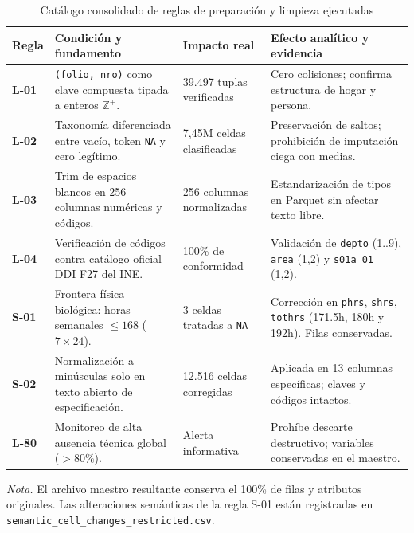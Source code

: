 \begin{table}[htbp]
\centering
\caption{Catálogo consolidado de reglas de preparación y limpieza ejecutadas}
\label{tab:reglas}
\begin{tabularx}{\textwidth}{>{\raggedright\arraybackslash\small}p{1.2cm}>{\raggedright\arraybackslash\small}p{3.8cm}>{\raggedright\arraybackslash\small}p{1.7cm}>{\raggedright\arraybackslash\small}X}
\toprule
\textbf{Regla} & \textbf{Condición y fundamento} & \textbf{Impacto real} & \textbf{Efecto analítico y evidencia} \\
\midrule
\textbf{L-01} & \texttt{(folio, nro)} como clave compuesta tipada a enteros $\mathbb{Z}^+$. & 39.497 tuplas verificadas & Cero colisiones; confirma estructura de hogar y persona. \\
\textbf{L-02} & Taxonomía diferenciada entre vacío, token \texttt{NA} y cero legítimo. & 7,45M celdas clasificadas & Preservación de saltos; prohibición de imputación ciega con medias. \\
\textbf{L-03} & Trim de espacios blancos en 256 columnas numéricas y códigos. & 256 columnas normalizadas & Estandarización de tipos en Parquet sin afectar texto libre. \\
\textbf{L-04} & Verificación de códigos contra catálogo oficial DDI F27 del INE. & 100\% de conformidad & Validación de \texttt{depto} (1..9), \texttt{area} (1,2) y \texttt{s01a\_01} (1,2). \\
\textbf{S-01} & Frontera física biológica: horas semanales $\le 168$ ($7 \times 24$). & 3 celdas tratadas a \texttt{NA} & Corrección en \texttt{phrs}, \texttt{shrs}, \texttt{tothrs} (171.5h, 180h y 192h). Filas conservadas. \\
\textbf{S-02} & Normalización a minúsculas solo en texto abierto de especificación. & 12.516 celdas corregidas & Aplicada en 13 columnas específicas; claves y códigos intactos. \\
\textbf{L-80} & Monitoreo de alta ausencia técnica global ($>80\%$). & Alerta informativa & Prohíbe descarte destructivo; variables conservadas en el maestro. \\
\bottomrule
\end{tabularx}
\par\vspace{3pt}\parbox{\textwidth}{\footnotesize\textit{Nota.} El archivo maestro resultante conserva el 100\% de filas y atributos originales. Las alteraciones semánticas de la regla S-01 están registradas en \texttt{semantic\_cell\_changes\_restricted.csv}.}
\end{table}

